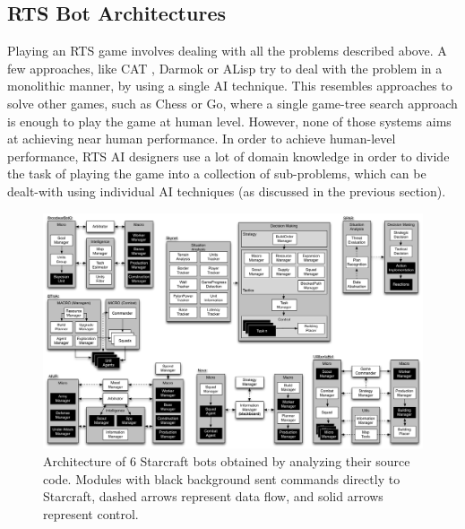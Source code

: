 \documentclass[journal]{IEEEtran}
\begin{document}
\subsection{RTS Bot Architectures}\label{sec:integration}

Playing an RTS game involves dealing with all the problems described above. A few approaches, like CAT \cite{LTW}, Darmok \cite{OntanonMSR10} or ALisp \cite{Marthi05} try to deal with the problem in a monolithic manner, by using a single AI technique. This resembles approaches to solve other games, such as Chess or Go, where a single game-tree search approach is enough to play the game at human level. However, none of those systems aims at achieving near human performance. In order to achieve human-level performance, RTS AI designers use a lot of domain knowledge in order to divide the task of playing the game into a collection of sub-problems, which can be dealt-with using individual AI techniques (as discussed in the previous section). 

\begin{figure}[ta]
    \centering
    \includegraphics[width=\textwidth]{figures/figure-bot-architectures-wide.pdf}
    \caption{Architecture of 6 Starcraft bots obtained by analyzing their source code. Modules with black background sent commands directly to Starcraft, dashed arrows represent data flow, and solid arrows represent control.}
    \label{fig:bot-architecture}
\end{figure}
\end{document}
